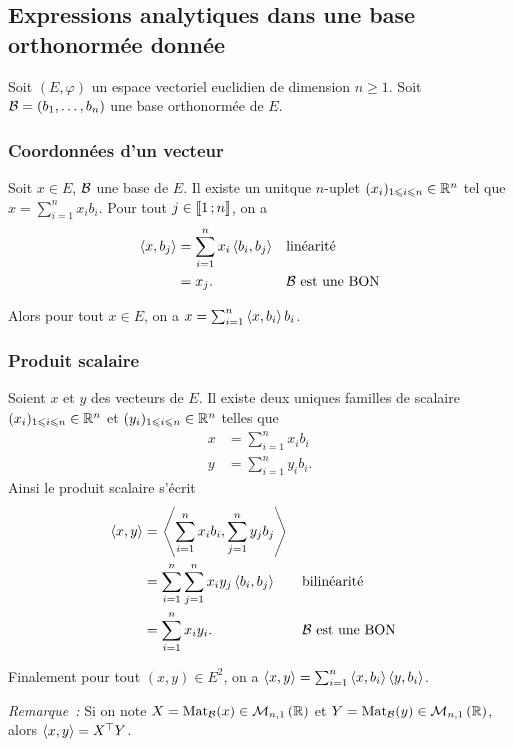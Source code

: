 \subsection{Expressions analytiques dans une base orthonormée donnée}

Soit $(E,\varphi)$ un espace vectoriel euclidien de dimension $n \geqslant 1$. Soit $\mathcal{B}=(b_1, \ldots, b_n)$ une base orthonormée de $E$.

\subsubsection{Coordonnées d'un vecteur}

Soit $x \in E$, $\mathcal{B}$ une base de $E$. Il existe un unitque $n$-uplet $(x_i)_{1 \leqslant i \leqslant n}\in\mathbb{R}^n$ tel que $x = \sum_{i=1}^n x_ib_i$. Pour tout $j \in \mathopen{\llbracket}1\mathclose{}\mathpunct{};n\mathclose{\rrbracket}$, on a
\begin{align}
  \left\langle{x},{b_j}\right\rangle &=\sum_{i=1}^n x_i\left\langle{b_i},{b_j}\right\rangle && \text{linéarité} \\
  &=x_j. && \mathcal{B} \text{~est une BON}
\end{align}

Alors pour tout $x \in E$, on a $x = \sum_{i=1}^n \left\langle{x},{b_i}\right\rangle b_i$.

\subsubsection{Produit scalaire}

Soient $x$ et $y$ des vecteurs de $E$. Il existe deux uniques familles de scalaire $(x_i)_{1 \leqslant i \leqslant n}\in\mathbb{R}^n$ et $(y_i)_{1 \leqslant i \leqslant n}\in\mathbb{R}^n$ telles que
\begin{align}
  x &= \sum_{i=1}^n x_ib_i \\
  y &= \sum_{i=1}^n y_ib_i.
\end{align}
Ainsi le produit scalaire s'écrit
\begin{align}
  \left\langle{x},{y}\right\rangle &=\left\langle{\sum_{i=1}^n x_ib_i},{\sum_{j=1}^n y_jb_j}\right\rangle \\
  &=\sum_{i=1}^n  \sum_{j=1}^n x_i y_j \left\langle{b_i},{b_j}\right\rangle && \text{bilinéarité} \\
  &=\sum_{i=1}^n  x_i y_i. && \mathcal{B} \text{~est une BON}
\end{align}

Finalement pour tout $(x,y) \in E^2$, on a $\left\langle{x},{y}\right\rangle = \sum_{i=1}^n \left\langle{x},{b_i}\right\rangle\left\langle{y},{b_i}\right\rangle$.

\emph{Remarque~:} Si on note $X=\mathrm{Mat}_{\mathcal{B}}(x) \in \mathcal{M}_{n,1}\left(\mathbb{R}\right)$ et $Y=\mathrm{Mat}_{\mathcal{B}}(y) \in \mathcal{M}_{n,1}\left(\mathbb{R}\right)$, alors $\left\langle{x},{y}\right\rangle = X^{\top}Y$.

